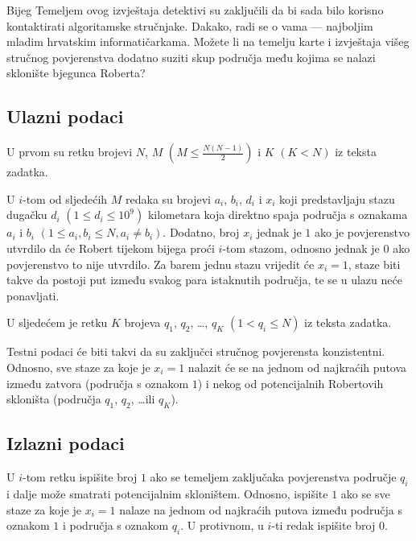 \begin{statement}[
  problempoints=100,
  timelimit=1 sekunda,
  memorylimit=512 MiB,
]{Bijeg}
Temeljem ovog izvještaja detektivi su zaključili da bi sada bilo korisno
kontaktirati algoritamske stručnjake. Dakako, radi se o vama --- najboljim
mladim hrvatskim informatičarkama. Možete li na temelju karte i izvještaja višeg
stručnog povjerenstva dodatno suziti skup područja među kojima se nalazi
sklonište bjegunca Roberta?

\subsection*{Ulazni podaci}

U prvom su retku brojevi $N$, $M$ $(M \le \frac{N(N-1)}{2})$ i $K$ $(K < N)$
iz teksta zadatka.

U $i$-tom od sljedećih $M$ redaka su brojevi $a_i$, $b_i$, $d_i$ i $x_i$ koji
predstavljaju stazu dugačku $d_i$ $(1 \le d_i \le 10^9)$ kilometara koja
direktno spaja područja s oznakama $a_i$ i $b_i$ $(1 \le a_i, b_i \le N, a_i
\ne b_i)$. Dodatno, broj $x_i$ jednak je $1$ ako je povjerenstvo utvrdilo da će
Robert tijekom bijega proći $i$-tom stazom, odnosno jednak je $0$ ako
povjerenstvo to nije utvrdilo. Za barem jednu stazu vrijedit će $x_i = 1$,
staze biti takve da postoji put između svakog para istaknutih područja, te se u
ulazu neće ponavljati.

U sljedećem je retku $K$ brojeva $q_1$, $q_2$, \ldots, $q_K$ $(1 < q_i \le N)$
iz teksta zadatka.

Testni podaci će biti takvi da su zaključci stručnog povjerensta konzistentni.
Odnosno, sve staze za koje je $x_i = 1$ nalazit će se na jednom od najkraćih
putova između zatvora (područja s oznakom $1$) i nekog od potencijalnih
Robertovih skloništa (područja $q_1$, $q_2$, \ldots ili $q_K$).

\clearpage

\subsection*{Izlazni podaci}

U $i$-tom retku ispišite broj $1$ ako se temeljem zaključaka povjerenstva područje
$q_i$ i dalje može smatrati potencijalnim skloništem. Odnosno, ispišite $1$ ako
se sve staze za koje je $x_i = 1$ nalaze na jednom od najkraćih putova između
područja s oznakom $1$ i područja s oznakom $q_i$. U protivnom, u $i$-ti redak
ispišite broj $0$.


\end{statement}
